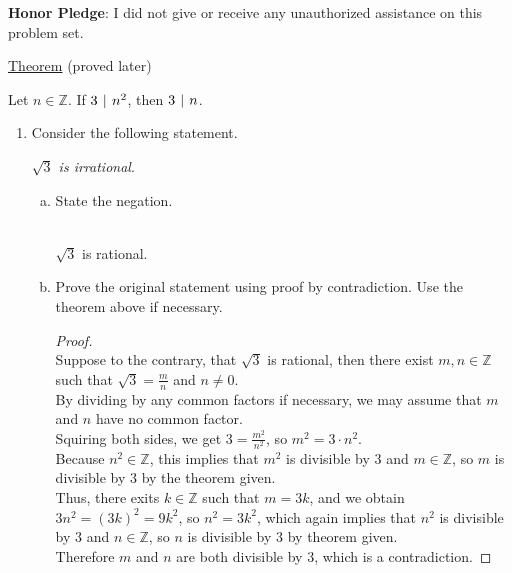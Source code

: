 \documentclass[12pt]{amsart}
\renewcommand*\divides{\hspace{0.05in}|\hspace{0.05in}}
\begin{document}
\vfill
\noindent
\textbf{Honor Pledge}: I did not give or receive any unauthorized assistance on this problem set.

\vspace{0.5in}
\hfill\makebox[3.0in]{\hrulefill}

\hfill{}

\newpage
\noindent
\underline{Theorem} (proved later)

\vspace{0.05in}
\noindent
Let $n\in\mathbb{Z}$.  If $3\divides n^{2}$, then $3\divides n$.

\vspace{0.2in}
\begin{enumerate}[{\bfseries 1.}]
\item Consider the following statement.

	\vspace{0.1in}
	\begin{center}
	\noindent
	\textit{$\sqrt{3}$ is irrational}.
	\end{center}

	\begin{enumerate}[(a)]
	\vspace{0.1in}
	\item State the negation.
	\begin{normalize}
	\vspace{0.1in}
	\\ $\sqrt{3}$ is rational.
	\end{normalize}
	\item Prove the original statement using proof by contradiction.  Use the theorem above if necessary.
	\begin{normalize}
	\vspace{0.1in}
	\begin{proof}
	\\ Suppose to the contrary, that $\sqrt{3}$ is rational, then there exist $m, n \in\mathbb{Z}$ such that $\sqrt{3} = \frac{m}{n}$ and $n \neq 0$.
	\\ By dividing by any common factors if necessary, we may assume that $m$ and $n$ have no common factor.
	\\ Squiring both sides, we get $3 = \frac{m^2}{n^2}$, so $m^2 = 3\cdot n^2$.
	\\ Because $n^2 \in\mathbb{Z}$, this implies that  $m^2$ is divisible by $3$ and $m \in\mathbb{Z}$, so $m$ is divisible by $3$ by the theorem given.
	\\ Thus, there exits $k \in\mathbb{Z}$ such that $m = 3k$, and we obtain $3n^2 = (3k)^2 = 9k^2$, so $n^2 = 3k^2$, which again implies that $n^2$ is divisible by $3$ and $n\in\mathbb{Z}$, so $n$ is divisible by $3$ by theorem given.
	\\ Therefore $m$ and $n$ are both divisible by 3, which is a contradiction. 
	\end{proof}
	\end{normalize}
	\vfill
	\vfill
	\vfill
	\vfill
	\vfill
	\end{enumerate}


\end{enumerate}
\end{document}
